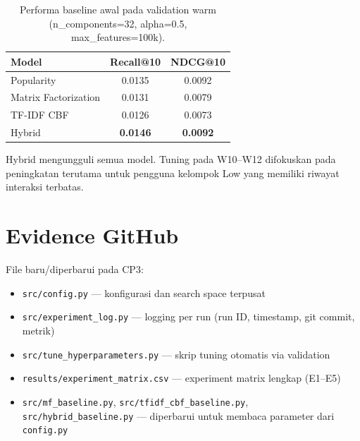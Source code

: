 \documentclass[10pt,a4paper]{article}
\begin{document}
\begin{table}[h!]
\centering
\begin{tabular}{@{}lcc@{}}
\toprule
\textbf{Model} & \textbf{Recall@10} & \textbf{NDCG@10} \\
\midrule
Popularity           & 0.0135 & 0.0092 \\
Matrix Factorization & 0.0131 & 0.0079 \\
TF-IDF CBF           & 0.0126 & 0.0073 \\
Hybrid               & \textbf{0.0146} & \textbf{0.0092} \\
\bottomrule
\end{tabular}
\caption{Performa baseline awal pada validation warm (n\_components=32, alpha=0.5, max\_features=100k).}
\end{table}

Hybrid mengungguli semua model. Tuning pada W10--W12 difokuskan pada peningkatan terutama
untuk pengguna kelompok Low yang memiliki riwayat interaksi terbatas.

\section{Evidence GitHub}

File baru/diperbarui pada CP3:
\begin{itemize}[leftmargin=*, nosep]
  \item \texttt{src/config.py} --- konfigurasi dan search space terpusat
  \item \texttt{src/experiment\_log.py} --- logging per run (run ID, timestamp, git commit, metrik)
  \item \texttt{src/tune\_hyperparameters.py} --- skrip tuning otomatis via validation
  \item \texttt{results/experiment\_matrix.csv} --- experiment matrix lengkap (E1--E5)
  \item \texttt{src/mf\_baseline.py}, \texttt{src/tfidf\_cbf\_baseline.py}, \texttt{src/hybrid\_baseline.py}
        --- diperbarui untuk membaca parameter dari \texttt{config.py}
\end{itemize}
\end{document}
